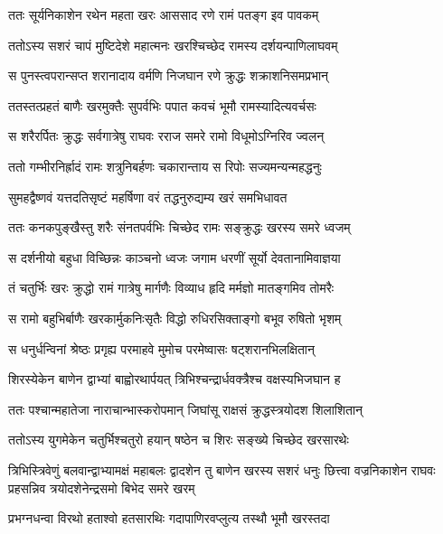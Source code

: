 \twolineshloka
{ततः सूर्यनिकाशेन रथेन महता खरः}
{आससाद रणे रामं पतङ्ग इव पावकम्} %

\twolineshloka
{ततोऽस्य सशरं चापं मुष्टिदेशे महात्मनः}
{खरश्चिच्छेद रामस्य दर्शयन्पाणिलाघवम्} %

\twolineshloka
{स पुनस्त्वपरान्सप्त शरानादाय वर्मणि}
{निजघान रणे क्रुद्धः शक्राशनिसमप्रभान्} %

\twolineshloka
{ततस्तत्प्रहतं बाणैः खरमुक्तैः सुपर्वभिः}
{पपात कवचं भूमौ रामस्यादित्यवर्चसः} %

\twolineshloka
{स शरैरर्पितः क्रुद्धः सर्वगात्रेषु राघवः}
{रराज समरे रामो विधूमोऽग्निरिव ज्वलन्} %

\twolineshloka
{ततो गम्भीरनिर्ह्रादं रामः शत्रुनिबर्हणः}
{चकारान्ताय स रिपोः सज्यमन्यन्महद्धनुः} %

\twolineshloka
{सुमहद्वैष्णवं यत्तदतिसृष्टं महर्षिणा}
{वरं तद्धनुरुद्यम्य खरं समभिधावत} %

\twolineshloka
{ततः कनकपुङ्खैस्तु शरैः संनतपर्वभिः}
{चिच्छेद रामः सङ्क्रुद्धः खरस्य समरे ध्वजम्} %

\twolineshloka
{स दर्शनीयो बहुधा विच्छिन्नः काञ्चनो ध्वजः}
{जगाम धरणीं सूर्यो देवतानामिवाज्ञया} %

\twolineshloka
{तं चतुर्भिः खरः क्रुद्धो रामं गात्रेषु मार्गणैः}
{विव्याध हृदि मर्मज्ञो मातङ्गमिव तोमरैः} %

\twolineshloka
{स रामो बहुभिर्बाणैः खरकार्मुकनिःसृतैः}
{विद्धो रुधिरसिक्ताङ्गो बभूव रुषितो भृशम्} %

\twolineshloka
{स धनुर्धन्विनां श्रेष्ठः प्रगृह्य परमाहवे}
{मुमोच परमेष्वासः षट्शरानभिलक्षितान्} %

\twolineshloka
{शिरस्येकेन बाणेन द्वाभ्यां बाह्वोरथार्पयत्}
{त्रिभिश्चन्द्रार्धवक्त्रैश्च वक्षस्यभिजघान ह} %

\twolineshloka
{ततः पश्चान्महातेजा नाराचान्भास्करोपमान्}
{जिघांसू राक्षसं क्रुद्धस्त्रयोदश शिलाशितान्} %

\twolineshloka
{ततोऽस्य युगमेकेन चतुर्भिश्चतुरो हयान्}
{षष्ठेन च शिरः सङ्ख्ये चिच्छेद खरसारथेः} %

\fourlineshloka
{त्रिभिस्त्रिवेणुं बलवान्द्वाभ्यामक्षं महाबलः}
{द्वादशेन तु बाणेन खरस्य सशरं धनुः}
{छित्त्वा वज्रनिकाशेन राघवः प्रहसन्निव}
{त्रयोदशेनेन्द्रसमो बिभेद समरे खरम्} %

\twolineshloka
{प्रभग्नधन्वा विरथो हताश्वो हतसारथिः}
{गदापाणिरवप्लुत्य तस्थौ भूमौ खरस्तदा} %

